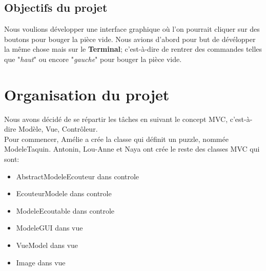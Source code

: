 \documentclass[french,12pt]{article}
\begin{document}
\subsection{Objectifs du projet}

Nous voulions développer une interface graphique où l'on pourrait cliquer sur des boutons pour bouger la pièce vide. Nous avions d'abord pour but de dévélopper la même chose mais sur le \textbf{Terminal}; c'est-à-dire de rentrer des commandes telles que "\textit{haut}" ou encore "\textit{gauche}" pour bouger la pièce vide. 

\section{Organisation du projet}

Nous avons décidé de se répartir les tâches en suivant le concept MVC, c'est-à-dire Modèle, Vue, Contrôleur.\\

Pour commencer, Amélie a crée la classe qui définit un puzzle, nommée \textsf{ModeleTaquin}.
Antonin, Lou-Anne et Naya ont crée le reste des classes MVC qui sont:

\begin{itemize}
\item \textsf{AbstractModeleEcouteur} dans \textsf{controle}
\item \textsf{EcouteurModele} dans \textsf{controle}
\item \textsf{ModeleEcoutable} dans \textsf{controle}
\item \textsf{ModeleGUI} dans \textsf{vue}
\item \textsf{VueModel} dans \textsf{vue}
\item \textsf{Image} dans \textsf{vue}\\
\end{itemize} 
\end{document}
